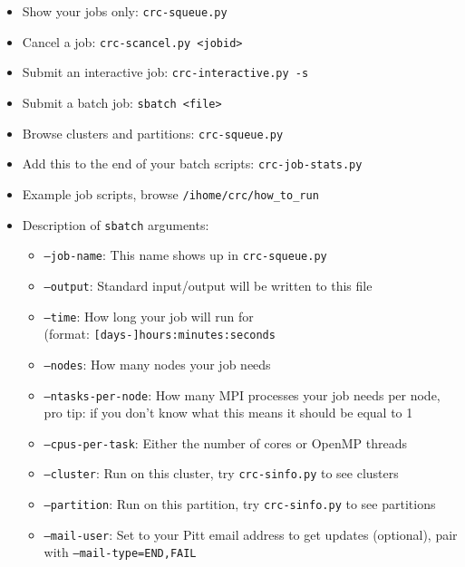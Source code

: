\documentclass[landscape,a0b,final]{a0poster}
\newcommand{\code}[1]{\texttt{#1}}
\newcommand{\mysection}[1]{
    \begin{center}
        \pbox{0.8\columnwidth}{}{linewidth=3mm,framearc=0.3,linecolor=black,fillstyle=gradient,gradangle=0,gradbegin=white,gradend=white,gradmidpoint=1.0,framesep=0.5em}{
            \begin{center}
                \Large\color{black}{\bf{#1}}
            \end{center}
        }
    \end{center}
    \vspace{0.25cm}
}
\newenvironment{poster}{
  \begin{center}
  \begin{minipage}[c]{0.981\textwidth}
}{
  \end{minipage} 
  \end{center}
}
\newcommand{\pbox}[4]{
\psshadowbox[#3]{
\begin{minipage}[t][#2][t]{#1}
#4
\end{minipage}
}}
\begin{document}
\begin{poster}
\begin{multicols}{3}
    \vspace{0.1cm}
    \mysection{Slurm Jobs}
    \Large    
    \begin{center}
        \begin{itemize}
            \item Show your jobs only: \code{crc-squeue.py}
            \item Cancel a job: \code{crc-scancel.py <jobid>}
            \item Submit an interactive job: \code{crc-interactive.py -s}
            \item Submit a batch job: \code{sbatch <file>}
            \item Browse clusters and partitions: \code{crc-squeue.py}
            \item Add this to the end of your batch scripts: \code{crc-job-stats.py}
            \item Example job scripts, browse \code{/ihome/crc/how_to_run}
            \item Description of \code{sbatch} arguments:
            \begin{itemize}
                \item \code{--job-name}: This name shows up in \code{crc-squeue.py}
                \item \code{--output}: Standard input/output will be written to this file
                \item \code{--time}: How long your job will run for \\
                    (format: \code{[days-]hours:minutes:seconds}
                \item \code{--nodes}: How many nodes your job needs
                \item \code{--ntasks-per-node}: How many MPI processes your job
                    needs per node, pro tip: if you don't know what this means
                    it should be equal to 1
                \item \code{--cpus-per-task}: Either the number of cores or OpenMP threads
                \item \code{--cluster}: Run on this cluster, try \code{crc-sinfo.py} to see clusters
                \item \code{--partition}: Run on this partition, try \code{crc-sinfo.py} to see partitions
                \item \code{--mail-user}: Set to your Pitt email address to get updates (optional), pair with \code{--mail-type=END,FAIL}
            \end{itemize}

\end{itemize}
\end{center}
\end{multicols}
\end{poster}
\end{document}

